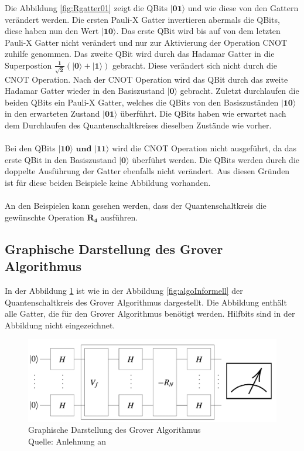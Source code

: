 \noindent
 Die Abbildung \ref{fig:Rgatter01} zeigt die QBits $\mathbf{|01\rangle}$  und wie diese von den Gattern verändert werden. Die ersten Pauli-X Gatter invertieren abermals die QBits, diese haben nun den Wert $\mathbf{|10\rangle}$. Das erste QBit wird bis auf von dem letzten Pauli-X Gatter nicht verändert und nur zur Aktivierung der Operation CNOT zuhilfe genommen. Das zweite QBit wird durch das Hadamar Gatter in die Superpostion $\mathbf{\frac{1}{\sqrt 2}(|0\rangle + |1\rangle)}$ gebracht. Diese verändert sich nicht durch die CNOT Operation. Nach der CNOT Operation wird das QBit durch das zweite Hadamar Gatter wieder in den Basiszustand $\mathbf{|0\rangle}$ gebracht. Zuletzt durchlaufen die beiden QBits ein Pauli-X Gatter, welches die QBits von den Basiszuständen $\mathbf{|10\rangle}$ in den erwarteten Zustand $\mathbf{|01\rangle}$ überführt. Die QBits haben wie erwartet nach dem Durchlaufen des Quantenschaltkreises dieselben Zustände wie vorher.
  \\ 
  \\
Bei den QBits $\mathbf{|10\rangle \text{ und }|11\rangle}$ wird die CNOT Operation nicht ausgeführt, da das erste QBit in den Basiszustand $\mathbf{|0\rangle}$ überführt werden. Die QBits werden durch die doppelte Ausführung der Gatter ebenfalls nicht verändert. Aus diesen Gründen ist für diese beiden Beispiele keine Abbildung vorhanden.
\\
\\
An den Beispielen kann gesehen werden, dass der Quantenschaltkreis die gewünschte Operation $\mathbf{R_4}$ ausführen.

\subsection{Graphische Darstellung des Grover Algorithmus}
In der Abbildung \ref{fig:algoFormell} ist wie in der Abbildung \ref{fig:algoInformell} der Quantenschaltkreis des Grover Algorithmus dargestellt. Die Abbildung enthält alle Gatter, die für den Grover Algorithmus benötigt werden. Hilfbits sind in der Abbildung nicht eingezeichnet.
\begin{figure}[hbtp]
	\centering
	\includegraphics[width=1\textwidth]{figures/algoFormell.png}
	\caption{Graphische Darstellung des Grover Algorithmus \\ Quelle: Anlehnung an \cite[S. 146]{Ho17} }
	\label{fig:algoFormell}
\end{figure}



